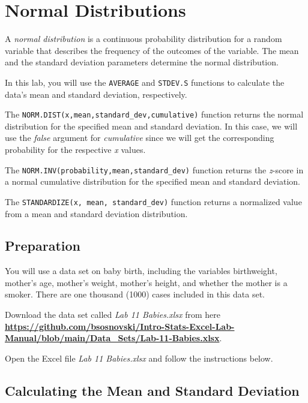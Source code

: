 \documentclass[
]{book}
\begin{document}
\hypertarget{normal-distributions}{%
\chapter{Normal Distributions}\label{normal-distributions}}

A \emph{normal distribution} is a continuous probability distribution for a random variable that describes the frequency of the outcomes of the variable. The mean and the standard deviation parameters determine the normal distribution.

In this lab, you will use the \texttt{AVERAGE} and \texttt{STDEV.S} functions to calculate the data's mean and standard deviation, respectively.

The \texttt{NORM.DIST(x,mean,standard\_dev,cumulative)} function returns the normal distribution for the specified mean and standard deviation. In this case, we will use the \emph{false} argument for \emph{cumulative} since we will get the corresponding probability for the respective \emph{x} values.

The \texttt{NORM.INV(probability,mean,standard\_dev)} function returns the \emph{z}-score in a normal cumulative distribution for the specified mean and standard deviation.

The \texttt{STANDARDIZE(x,\ mean,\ standard\_dev)} function returns a normalized value from a mean and standard deviation distribution.

\hypertarget{preparation-7}{%
\section{Preparation}\label{preparation-7}}

You will use a data set on baby birth, including the variables birthweight, mother's age, mother's weight, mother's height, and whether the mother is a smoker. There are one thousand (1000) cases included in this data set.

Download the data set called \emph{Lab 11 Babies.xlsx} from here \href{https://github.com/bsosnovski/Intro-Stats-Excel-Lab-Manual/blob/main/Data_Sets/Lab-11-Babies.xlsx}{\textbf{https://github.com/bsosnovski/Intro-Stats-Excel-Lab-Manual/blob/main/Data\_Sets/Lab-11-Babies.xlsx}}.

Open the Excel file \emph{Lab 11 Babies.xlsx} and follow the instructions below.

\hypertarget{calculating-the-mean-and-standard-deviation}{%
\section{Calculating the Mean and Standard Deviation}\label{calculating-the-mean-and-standard-deviation}}
\end{document}
